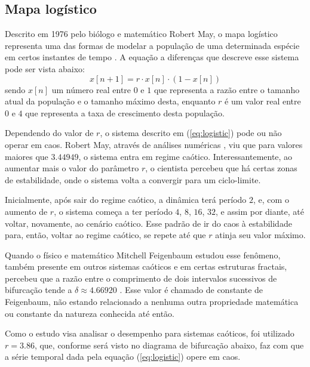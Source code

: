 \documentclass[a4paper, 12pt]{article}
\begin{document}
\subsection{Mapa logístico}

Descrito em 1976 pelo biólogo e matemático Robert May, o mapa logístico representa uma das formas de modelar a população de uma determinada espécie em certos instantes de tempo \cite{may1976simple}. A equação a diferenças que descreve esse sistema pode ser vista abaixo:
\begin{equation}\label{eq:logistic}
x[n+1] = r\cdot x[n] \cdot (1 - x[n])
\end{equation}
sendo $x[n]$ um número real entre $0$ e $1$ que representa a razão entre o tamanho atual da população e o tamanho máximo desta, enquanto $r$ é um valor real entre $0$ e $4$ que representa a taxa de crescimento desta população. 

Dependendo do valor de $r$, o sistema descrito em (\ref{eq:logistic}) pode ou não operar em caos. Robert May, através de análises numéricas \cite{gleick1998chaos}, viu que para valores maiores que $3.44949$, o sistema entra em regime caótico. Interessantemente, ao aumentar mais o valor do parâmetro $r$, o cientista percebeu que há certas zonas de estabilidade, onde o sistema volta a convergir para um ciclo-limite. 

Inicialmente, após sair do regime caótico, a dinâmica terá período $2$, e, com o aumento de $r$, o sistema começa a ter período $4$, $8$, $16$, $32$, e assim por diante, até voltar, novamente, ao cenário caótico. Esse padrão de ir do caos à estabilidade para, então, voltar ao regime caótico, se repete até que $r$ atinja seu valor máximo.

Quando o físico e matemático Mitchell Feigenbaum estudou esse fenômeno, também presente em outros sistemas caóticos e em certas estruturas fractais, percebeu que a razão entre o comprimento de dois intervalos sucessivos de bifurcação tende a $\delta \approx 4.66920$ \cite{feigenbaum1978quantitative}. Esse valor é chamado de constante de Feigenbaum, não estando relacionado a nenhuma outra propriedade matemática ou constante da natureza conhecida até então.

Como o estudo visa analisar o desempenho para sistemas caóticos, foi utilizado $r=3.86$, que, conforme será visto no diagrama de bifurcação abaixo, faz com que a série temporal dada pela equação (\ref{eq:logistic}) opere em caos. 
\end{document}
